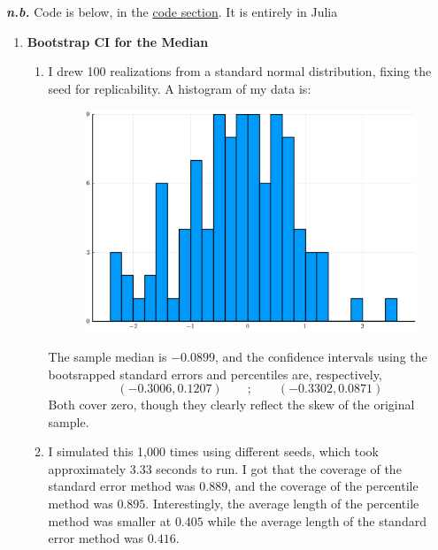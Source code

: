 \documentclass[10pt]{article}
\begin{document}
\maketitle

\textbf{\textit{n.b.}} Code is below, in the \href{code}{code section}. It is entirely in Julia

\begin{enumerate}
	\item \textbf{Bootstrap CI for the Median} \begin{enumerate} \item I drew 100 realizations from a standard normal distribution, fixing the seed for replicability. A histogram of my data is: \begin{figure}[H]\centering\includegraphics[width=10cm]{ps6_code/ps6_hist.png}\end{figure}The sample median is $-0.0899$, and the confidence intervals using the bootsrapped standard errors and percentiles are, respectively,\[(-0.3006,0.1207) \qquad ; \qquad (-0.3302,0.0871)\]Both cover zero, though they clearly reflect the skew of the original sample. \item I simulated this 1,000 times using different seeds, which took approximately 3.33 seconds to run. I got that the coverage of the standard error method was $0.889$, and the coverage of the percentile method was $0.895$. Interestingly, the average length of the percentile method was smaller at $0.405$ while the average length of the standard error method was $0.416$. \end{enumerate}

\end{enumerate}
\end{document}
